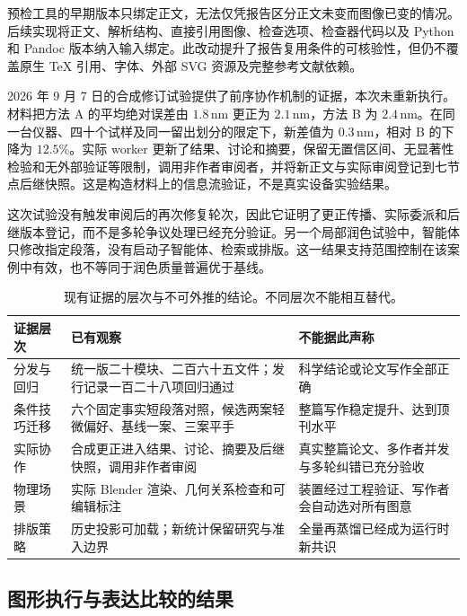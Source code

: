 \documentclass[UTF8,a4paper,zihao=-4,fontset=fandol]{ctexart}
\begin{document}
预检工具的早期版本只绑定正文，无法仅凭报告区分正文未变而图像已变的情况。后续实现将正文、解析结构、直接引用图像、检查选项、检查器代码以及 Python 和 Pandoc 版本纳入输入绑定。此改动提升了报告复用条件的可核验性，但仍不覆盖原生 TeX 引用、字体、外部 SVG 资源及完整参考文献依赖\cite{native}。

2026 年 9 月 7 日的合成修订试验提供了前序协作机制的证据，本次未重新执行。材料把方法 A 的平均绝对误差由 $1.8\,\mathrm{nm}$ 更正为 $2.1\,\mathrm{nm}$，方法 B 为 $2.4\,\mathrm{nm}$。在同一台仪器、四十个试样及同一留出划分的限定下，新差值为 $0.3\,\mathrm{nm}$，相对 B 的下降为 $12.5\%$。实际 worker 更新了结果、讨论和摘要，保留无置信区间、无显著性检验和无外部验证等限制，调用非作者审阅者，并将新正文与实际审阅登记到七节点后继快照\cite{native}。这是构造材料上的信息流验证，不是真实设备实验结果。

这次试验没有触发审阅后的再次修复轮次，因此它证明了更正传播、实际委派和后继版本登记，而不是多轮争议处理已经充分验证。另一个局部润色试验中，智能体只修改指定段落，没有启动子智能体、检索或排版。这一结果支持范围控制在该案例中有效，也不等同于润色质量普遍优于基线。

\begin{table}[htbp]
\centering\small
\caption{现有证据的层次与不可外推的结论。不同层次不能相互替代。}
\label{tab:evidence}
\begin{tabularx}{\linewidth}{@{}p{25mm}YY@{}}
\toprule
证据层次 & 已有观察 & 不能据此声称\\
\midrule
分发与回归 & 统一版二十模块、二百六十五文件；发行记录一百二十八项回归通过 & 科学结论或论文写作全部正确\\
条件技巧迁移 & 六个固定事实短段落对照，候选两案轻微偏好、基线一案、三案平手 & 整篇写作稳定提升、达到顶刊水平\\
实际协作 & 合成更正进入结果、讨论、摘要及后继快照，调用非作者审阅 & 真实整篇论文、多作者并发与多轮纠错已充分验收\\
物理场景 & 实际 Blender 渲染、几何关系检查和可编辑标注 & 装置经过工程验证、写作者会自动选对所有图意\\
排版策略 & 历史投影可加载；新统计保留研究与准入边界 & 全量再蒸馏已经成为运行时新共识\\
\bottomrule
\end{tabularx}
\end{table}

\subsection{图形执行与表达比较的结果}
\end{document}
